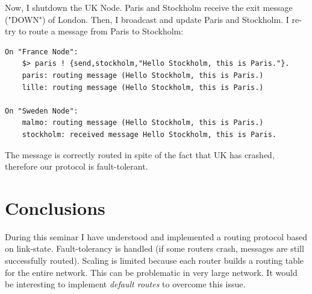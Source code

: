 \documentclass[a4paper, 11pt]{article}
\begin{document}
Now, I shutdown the UK Node. Paris and Stockholm receive the exit message ("DOWN") of London. Then, I broadcast and update Paris and Stockholm. I re-try to route a message from Paris to Stockholm:
\begin{lstlisting}
On "France Node":
	$> paris ! {send,stockholm,"Hello Stockholm, this is Paris."}.
	paris: routing message (Hello Stockholm, this is Paris.)
	lille: routing message (Hello Stockholm, this is Paris.)

On "Sweden Node":
	malmo: routing message (Hello Stockholm, this is Paris.)
	stockholm: received message Hello Stockholm, this is Paris.
\end{lstlisting}
The message is correctly routed in spite of the fact that UK has crashed, therefore our protocol is fault-tolerant.

\section{Conclusions}

During this seminar I have understood and implemented a routing protocol based on link-state. Fault-tolerancy is handled (if some routers crash, messages are still successfully routed). Scaling is limited because each router builds a routing table for the entire network. This can be problematic in very large network. It would be interesting to implement \textit{default routes} to overcome this issue.
\end{document}

